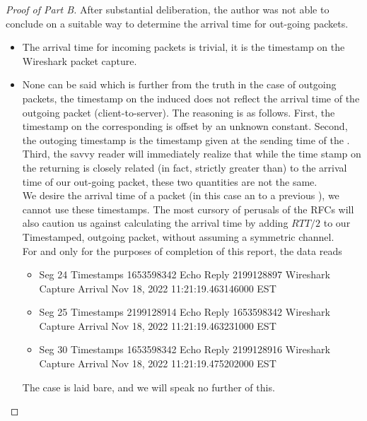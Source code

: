 \documentclass[../main.tex]{subfiles}
\begin{document}
\begin{proof}[Proof of Part B]
	After substantial deliberation, the author was not able to conclude on a suitable way to determine the arrival time for out-going packets. 
	\begin{itemize}
	    \item The arrival time for incoming packets is trivial, it is the timestamp on the Wireshark packet capture.
	    \item None can be said which is further from the truth in the case of outgoing packets, the timestamp on the induced  does not reflect the arrival time of the outgoing packet (client-to-server). The reasoning is as follows. First, the timestamp on the corresponding  is offset by an unknown constant. Second, the outoging timestamp is the timestamp given at the sending time of the .\\
	    
	    Third, the savvy reader will immediately realize that while the time stamp on the returning  is closely related (in fact, strictly greater than) to the arrival time of our out-going packet, these two quantities are not the same.\\ 
	    
	    We desire the arrival time of a packet (in this case an  to a previous ), we cannot use these timestamps. The most cursory of perusals of the RFCs will also caution us against calculating the arrival time by adding ${RTT}/2$ to our Timestamped, outgoing packet, without assuming a symmetric channel.\\
	    
	    For and only for the purposes of completion of this report, the data reads
	    \begin{itemize}
	        \item Seg 24 Timestamps 1653598342 	Echo Reply 2199128897		Wireshark Capture Arrival Nov 18, 2022 11:21:19.463146000 EST
	        \item Seg 25 Timestamps 2199128914 	Echo Reply 1653598342	Wireshark Capture Arrival Nov 18, 2022 11:21:19.463231000 EST
	        \item Seg 30 Timestamps 1653598342 	Echo Reply 2199128916		Wireshark Capture Arrival Nov 18, 2022 11:21:19.475202000 EST
        \end{itemize}
	    The case is laid bare, and we will speak no further of this.
	\end{itemize}
	\end{proof}
\end{document}
